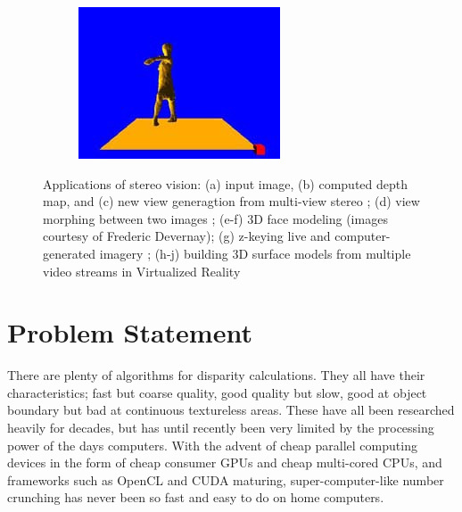 \begin{figure}
\begin{subfigure}[b]{0.3\textwidth}
    \includegraphics[width=\textwidth]{images/3d-reconstruction.png}
    \caption{}
  \end{subfigure}

  \caption{Applications of stereo vision: (a) input image, (b)
    computed depth map, and (c) new view generagtion from multi-view
    stereo \cite{matthies-kanade-szeliski}; (d) view morphing between
    two images \cite{seitz-dyer}; (e-f) 3D face modeling (images
    courtesy of Frederic Devernay); (g) z-keying live and
    computer-generated imagery \cite{kanade-yoshida-oda}; (h-j)
    building 3D surface models from multiple video streams in
    Virtualized Reality \cite{kanade-rander-narayanan}}
\end{figure}

\section{Problem Statement}\label{sect:prob-statement}

There are plenty of algorithms for disparity calculations. They all
have their characteristics; fast but coarse quality, good quality but
slow, good at object boundary but bad at continuous textureless areas.
These have all been researched heavily for decades, but has until
recently been very limited by the processing power of the days
computers. With the advent of cheap parallel computing devices in the
form of cheap consumer GPUs and cheap multi-cored CPUs, and frameworks
such as OpenCL and CUDA maturing, super-computer-like number crunching
has never been so fast and easy to do on home computers.

